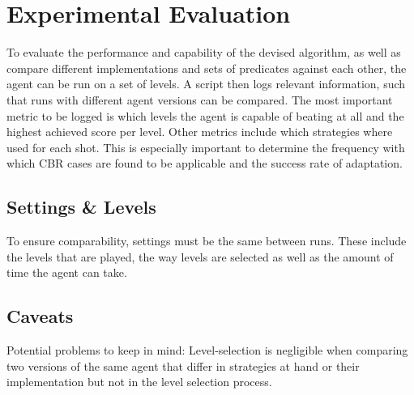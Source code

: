 \section{Experimental Evaluation}\label{sec:experimental}
To evaluate the performance and capability of the devised algorithm, as well as compare different implementations and sets of predicates against each other, the agent can be run on a set of levels.
A script then logs relevant information, such that runs with different agent versions can be compared.
The most important metric to be logged is which levels the agent is capable of beating at all and the highest achieved score per level.
Other metrics include which strategies where used for each shot.
This is especially important to determine the frequency with which \acs{CBR} cases are found to be applicable and the success rate of adaptation.



\subsection{Settings \& Levels}\label{subsec:experimental-settings}
To ensure comparability, settings must be the same between runs. These include the levels that are played, the way levels are selected as well as the amount of time the agent can take. %
\subsection{Caveats}\label{subsec:experimental-caveats}
Potential problems to keep in mind: Level-selection is negligible when comparing two versions of the same agent that differ in strategies at hand or their implementation but not in the level selection process.
%

%

%

